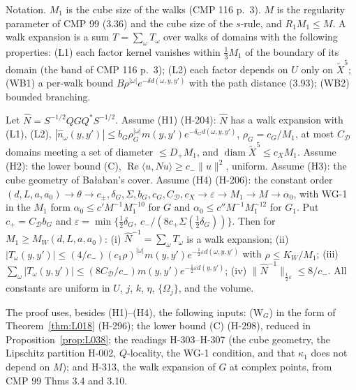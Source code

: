 Notation. $M_1$ is the cube size of the walks (CMP 116 p.~3). $M$ is the regularity parameter of CMP 99 (3.36) and the cube size of the $s$-rule, and $R_1M_1\le M$. A walk expansion is a sum $T=\sum_\omega T_\omega$ over walks of domains with the following properties: (L1) each factor kernel vanishes within $\tfrac13M_1$ of the boundary of its domain (the band of CMP 116 p.~3); (L2) each factor depends on $U$ only on $\tilde X^5$; (WB1) a per-walk bound $B\rho^{|\omega|}e^{-\delta d(\omega,y,y')}$ with the path distance (3.93); (WB2) bounded branching.

\begin{theorem}\label{thm:L017}
Let $\hat N=S^{-1/2}QGQ^*S^{-1/2}$. Assume (H1) (H-204): $\hat N$ has a walk expansion with (L1), (L2), $|\hat n_\omega(y,y')|\le b_G\rho_G^{|\omega|}m(y,y')e^{-\delta_Gd(\omega,y,y')}$, $\rho_G=c_G/M_1$, at most $C_{\mathcal D}$ domains meeting a set of diameter $\le D_+M_1$, and $\operatorname{diam}\tilde X^5\le c_XM_1$. Assume (H2): the lower bound (C), $\operatorname{Re}\langle u,\hat Nu\rangle\ge c_-\|u\|^2$, uniform. Assume (H3): the cube geometry of Ba{\l}aban's cover. Assume (H4) (H-206): the constant order $(d,L,a,a_0)\to\theta\to c_\pm,\delta_G,\Sigma,b_G,c_G,C_{\mathcal D},c_X\to\varepsilon\to M_1\to M\to\alpha_0$, with WG-1 in the $M_1$ form $\alpha_0\le c'M^{-1}M_1^{-10}$ for $G$ and $\alpha_0\le c''M^{-1}M_1^{-12}$ for $G_1$. Put $c_+=C_{\mathcal D}b_G$ and $\varepsilon=\min\{\tfrac12\delta_G,\ c_-/(8c_+\Sigma(\tfrac12\delta_G))\}$. Then for $M_1\ge M_W(d,L,a,a_0)$: (i) $\hat N^{-1}=\sum_\omega T_\omega$ is a walk expansion; (ii) $|T_\omega(y,y')|\le(4/c_-)(c_1\rho)^{|\omega|}m(y,y')e^{-\frac12\varepsilon d(\omega,y,y')}$ with $\rho\le K_W/M_1$; (iii) $\sum_\omega|T_\omega(y,y')|\le(8C_{\mathcal D}/c_-)m(y,y')e^{-\frac12\varepsilon d(y,y')}$; (iv) $\|\hat N^{-1}\|_{\frac12\varepsilon}\le8/c_-$. All constants are uniform in $U$, $j$, $k$, $\eta$, $\{\Omega_j\}$, and the volume.
\end{theorem}
The proof uses, besides (H1)--(H4), the following inputs: (W$_G$) in the form of Theorem~\ref{thm:L018} (H-296); the lower bound (C) (H-298), reduced in Proposition~\ref{prop:L038}; the readings H-303--H-307 (the cube geometry, the Lipschitz partition H-002, $Q$-locality, the WG-1 condition, and that $\kappa_1$ does not depend on $M$); and H-313, the walk expansion of $G$ at complex points, from CMP 99 Thms 3.4 and 3.10.


